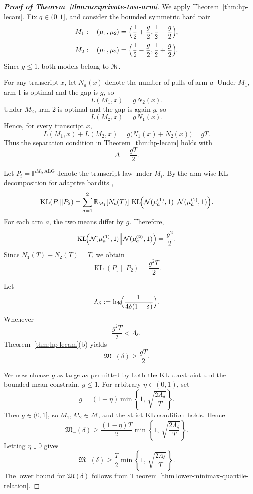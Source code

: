 \documentclass[journal]{IEEEtran}
\newcommand{\ALG}{\mathrm{ALG}}
\newcommand{\KL}{\operatorname{KL}}
\begin{document}
\begin{proof}[\textbf{Proof of Theorem~\ref{thm:nonprivate-two-arm}}]
We apply Theorem~\ref{thm:hp-lecam}. Fix \(g\in(0,1]\), and consider the
bounded symmetric hard pair
\[
M_1:\quad
(\mu_1,\mu_2)
=
\Bigl(\frac12+\frac g2,\frac12-\frac g2\Bigr),
\]
\[
M_2:\quad
(\mu_1,\mu_2)
=
\Bigl(\frac12-\frac g2,\frac12+\frac g2\Bigr).
\]
Since \(g\le 1\), both models belong to \(\mathcal M\).

For any transcript \(x\), let \(N_a(x)\) denote the number of pulls of arm
\(a\). Under \(M_1\), arm \(1\) is optimal and the gap is \(g\), so
\[
L(M_1,x)=g\,N_2(x).
\]
Under \(M_2\), arm \(2\) is optimal and the gap is again \(g\), so
\[
L(M_2,x)=g\,N_1(x).
\]
Hence, for every transcript \(x\),
\[
L(M_1,x)+L(M_2,x)
=
g\bigl(N_1(x)+N_2(x)\bigr)
=
gT.
\]
Thus the separation condition in Theorem~\ref{thm:hp-lecam} holds with
\[
\Delta=\frac{gT}{2}.
\]

Let \(P_i=\mathbb P^{M_i,\ALG}\) denote the transcript law under \(M_i\).
By the arm-wise KL decomposition for adaptive bandits \cite[Lemma 15.1]{lattimore2020bandit},
\[
\KL(P_1\|P_2)
=
\sum_{a=1}^2
\mathbb E_{M_1}[N_a(T)]\,
\KL\!\Bigl(
\mathcal N(\mu_a^{(1)},1)
\Big\|
\mathcal N(\mu_a^{(2)},1)
\Bigr).
\]
For each arm \(a\), the two means differ by \(g\). Therefore,
\[
\KL\!\Bigl(
\mathcal N(\mu_a^{(1)},1)
\Big\|
\mathcal N(\mu_a^{(2)},1)
\Bigr)
=
\frac{g^2}{2}.
\]
Since \(N_1(T)+N_2(T)=T\), we obtain
\[
\KL(P_1\|P_2)
=
\frac{g^2T}{2}.
\]

Let
\[
\Lambda_\delta
:=
\log\!\Bigl(\frac{1}{4\delta(1-\delta)}\Bigr).
\]
Whenever
\[
\frac{g^2T}{2}<\Lambda_\delta,
\]
Theorem~\ref{thm:hp-lecam}(b) yields
\[
\mathfrak M_-(\delta)\ge \frac{gT}{2}.
\]

We now choose \(g\) as large as permitted by both the KL constraint and the
bounded-mean constraint \(g\le 1\). For arbitrary \(\eta\in(0,1)\), set
\[
g
=
(1-\eta)
\min\!\left\{
1,\,
\sqrt{\frac{2\Lambda_\delta}{T}}
\right\}.
\]
Then \(g\in(0,1]\), so \(M_1,M_2\in\mathcal M\), and the strict KL condition
holds. Hence
\[
\mathfrak M_-(\delta)
\ge
\frac{(1-\eta)T}{2}
\min\!\left\{
1,\,
\sqrt{\frac{2\Lambda_\delta}{T}}
\right\}.
\]
Letting \(\eta\downarrow0\) gives
\[
\mathfrak M_-(\delta)
\ge
\frac{T}{2}
\min\!\left\{
1,\,
\sqrt{\frac{2\Lambda_\delta}{T}}
\right\}.
\]
The lower bound for \(\mathfrak M(\delta)\) follows from
Theorem~\ref{thm:lower-minimax-quantile-relation}.
\end{proof}
\end{document}
